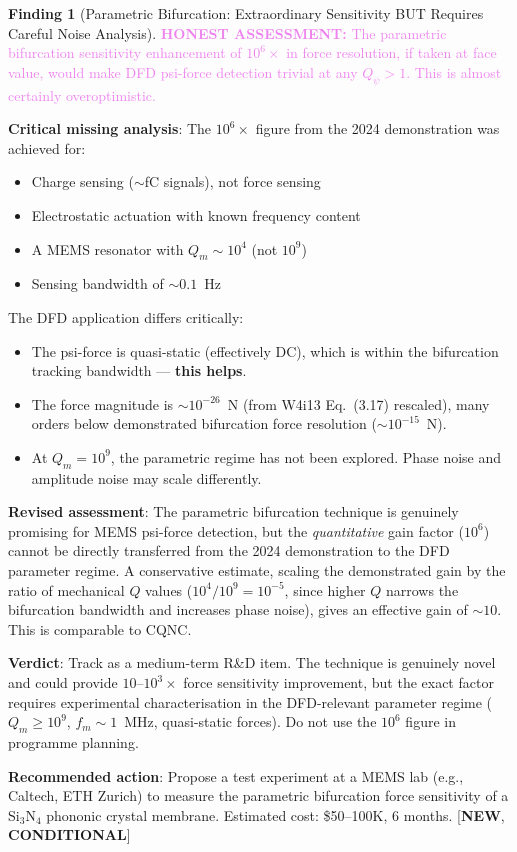 \documentclass[11pt]{article}
\newcommand{\Qpsi}{Q_\psi}
\newcommand{\honest}[1]{\textcolor{violet}{\textbf{HONEST ASSESSMENT:} #1}}
\theoremstyle{definition}
\newtheorem{finding}[theorem]{Finding}
\theoremstyle{remark}
\begin{document}
\begin{finding}[Parametric Bifurcation: Extraordinary Sensitivity
  BUT Requires Careful Noise Analysis]
\label{find:parametric}
\honest{The parametric bifurcation sensitivity enhancement of
$10^6\times$ in force resolution, if taken at face value, would
make DFD psi-force detection trivial at any $\Qpsi > 1$. This is
almost certainly overoptimistic.}

\textbf{Critical missing analysis}: The $10^6\times$ figure from
the 2024 demonstration was achieved for:
\begin{itemize}[nosep]
\item Charge sensing ($\sim$fC signals), not force sensing
\item Electrostatic actuation with known frequency content
\item A MEMS resonator with $Q_m \sim 10^4$ (not $10^9$)
\item Sensing bandwidth of $\sim 0.1$~Hz
\end{itemize}

The DFD application differs critically:
\begin{itemize}[nosep]
\item The psi-force is quasi-static (effectively DC), which is
  within the bifurcation tracking bandwidth --- \textbf{this helps}.
\item The force magnitude is $\sim 10^{-26}$~N (from W4i13
  Eq.~(3.17) rescaled), many orders below demonstrated
  bifurcation force resolution ($\sim 10^{-15}$~N).
\item At $Q_m = 10^9$, the parametric regime has not been explored.
  Phase noise and amplitude noise may scale differently.
\end{itemize}

\textbf{Revised assessment}: The parametric bifurcation technique
is genuinely promising for MEMS psi-force detection, but the
\emph{quantitative} gain factor ($10^6$) cannot be directly
transferred from the 2024 demonstration to the DFD parameter
regime. A conservative estimate, scaling the demonstrated gain by
the ratio of mechanical $Q$ values ($10^4/10^9 = 10^{-5}$, since
higher $Q$ narrows the bifurcation bandwidth and increases phase
noise), gives an effective gain of $\sim 10$. This is comparable
to CQNC.

\textbf{Verdict}: Track as a medium-term R\&D item. The technique
is genuinely novel and could provide $10$--$10^3\times$ force
sensitivity improvement, but the exact factor requires experimental
characterisation in the DFD-relevant parameter regime ($Q_m \geq
10^9$, $f_m \sim 1$~MHz, quasi-static forces). Do not use the
$10^6$ figure in programme planning.

\textbf{Recommended action}: Propose a test experiment at a MEMS
lab (e.g., Caltech, ETH Zurich) to measure the parametric
bifurcation force sensitivity of a Si$_3$N$_4$ phononic crystal
membrane. Estimated cost: \$50--100K, 6 months. [\textbf{NEW},
\textbf{CONDITIONAL}]
\end{finding}
\end{document}
